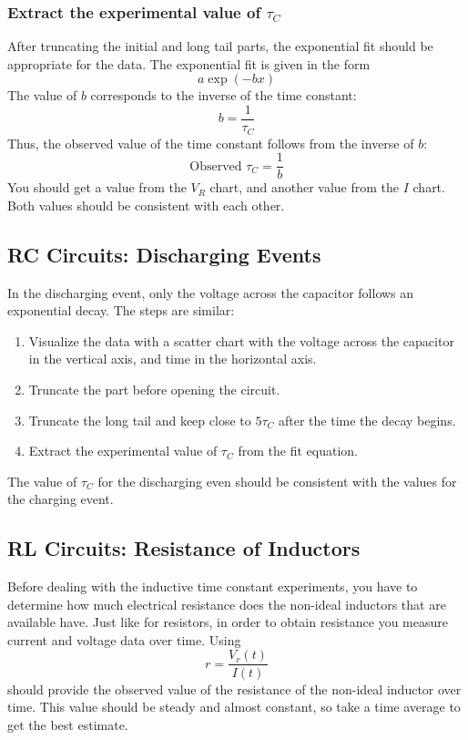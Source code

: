 \subsubsection{Extract the experimental value of $\tau_{C}$}
%
After truncating the initial and long tail parts, the exponential fit should be appropriate for the data. The exponential fit is given in the form
\begin{equation}
    a \exp(-bx)
\end{equation}
The value of $b$ corresponds to the inverse of the time constant:
\begin{equation}
    b = \frac{1}{\tau_{C}}
\end{equation}
Thus, the observed value of the time constant follows from the inverse of $b$:
\begin{equation}
    \text{Observed } \tau_{C} = \frac{1}{b}
\end{equation}
You should get a value from the $V_{R}$ chart, and another value from the $I$ chart. Both values should be consistent with each other.
%
\subsection{RC Circuits: Discharging Events}
%
In the discharging event, only the voltage across the capacitor follows an exponential decay. The steps are similar:
\begin{enumerate}
    \item Visualize the data with a scatter chart with the voltage across the capacitor in the vertical axis, and time in the horizontal axis.
    \item Truncate the part before opening the circuit.
    \item Truncate the long tail and keep close to $5\tau_{C}$ after the time the decay begins.
    \item Extract the experimental value of $\tau_{C}$ from the fit equation.
\end{enumerate}
The value of $\tau_{C}$ for the discharging even should be consistent with the values for the charging event.
%
\subsection{RL Circuits: Resistance of Inductors}
%
Before dealing with the inductive time constant experiments, you have to determine how much electrical resistance does the non-ideal inductors that are available have. Just like for resistors, in order to obtain resistance you measure current and voltage data over time. Using
\begin{equation}
    r = \frac{V_{r}(t)}{I(t)}
\end{equation}
should provide the observed value of the resistance of the non-ideal inductor over time. This value should be steady and almost constant, so take a time average to get the best estimate.

